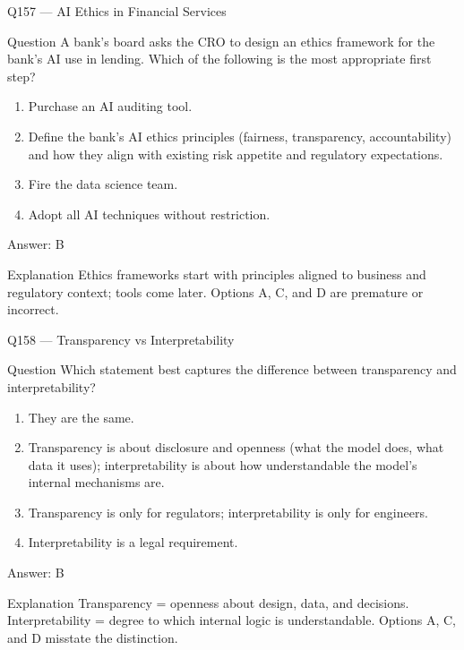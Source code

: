 \documentclass[aspectratio=169,8pt]{beamer}
\begin{document}
\begin{frame}{Q157 --- AI Ethics in Financial Services}
\begin{block}{Question}
A bank's board asks the CRO to design an ethics framework for the bank's AI use in lending. Which of the following is the most appropriate first step?
\begin{enumerate}
\item Purchase an AI auditing tool.
\item Define the bank's AI ethics principles (fairness, transparency, accountability) and how they align with existing risk appetite and regulatory expectations.
\item Fire the data science team.
\item Adopt all AI techniques without restriction.
\end{enumerate}  \end{block}
\begin{exampleblock}{Answer: B}\end{exampleblock}
\begin{block}{Explanation}
Ethics frameworks start with principles aligned to business and regulatory context; tools come later. Options A, C, and D are premature or incorrect.
\end{block}
\end{frame}

\begin{frame}{Q158 --- Transparency vs Interpretability}
\begin{block}{Question}
Which statement best captures the difference between transparency and interpretability?
\begin{enumerate}
\item They are the same.
\item Transparency is about disclosure and openness (what the model does, what data it uses); interpretability is about how understandable the model's internal mechanisms are.
\item Transparency is only for regulators; interpretability is only for engineers.
\item Interpretability is a legal requirement.
\end{enumerate}  \end{block}
\begin{exampleblock}{Answer: B}\end{exampleblock}
\begin{block}{Explanation}
Transparency = openness about design, data, and decisions. Interpretability = degree to which internal logic is understandable. Options A, C, and D misstate the distinction.
\end{block}
\end{frame}
\end{document}
